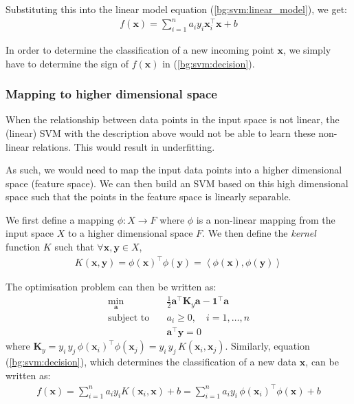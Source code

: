 \documentclass[12pt, twoside, a4paper]{article}
\def\vec{\boldsymbol}
\begin{document}
Substituting this into the linear model equation (\ref{bg:svm:linear_model}), we get:
\begin{align}
f(\vec{x}) = \sum_{i=1}^n a_i y_i \vec{x}_i^\top \vec{x} + b \label{bg:svm:decision}
\end{align}

In order to determine the classification of a new incoming point $\vec{x}$, we simply have to determine the sign of $f(\vec{x})$ in (\ref{bg:svm:decision}).

\subsubsection{Mapping to higher dimensional space}
When the relationship between data points in the input space is not linear, the (linear) SVM with the description above would not be able to learn these non-linear relations. This would result in underfitting.

As such, we would need to map the input data points into a higher dimensional space (feature space). We can then build an SVM based on this high dimensional space such that the points in the feature space is linearly separable.

We first define a mapping $\phi : X \rightarrow F$ where $\phi$ is a non-linear mapping from the input space $X$ to a higher dimensional space $F$. We then define the \textit{kernel} function $K$ such that $\forall \vec x, \vec y \in X$,
\begin{align*}
K(\vec x, \vec y) = \phi(\vec x)^\top \phi(\vec{y}) = \left\langle \phi(\vec x) , \phi(\vec{y}) \right\rangle
\end{align*}

The optimisation problem can then be written as:
\begin{align*}
\min_{\vec a} \quad &\frac{1}{2} \vec{a}^\top \vec{K}_y \vec{a} - \vec{1}^\top \vec a \\
\text{subject to} \quad &a_i \geq 0, \quad i = 1, \dots , n \\
&\vec{a}^\top \vec y = 0
\end{align*}
where $\vec{K}_y = y_i \, y_j \, \phi(\vec{x}_i)^\top \phi(\vec{x}_j) = y_i \, y_j \, K(\vec{x}_i, \vec{x}_j)$. Similarly, equation (\ref{bg:svm:decision}), which determines the classification of a new data $\vec{x}$, can be written as:
\begin{align*}
f(\vec{x}) = \sum_{i=1}^n a_i y_i K(\vec{x}_i, \vec{x}) + b = \sum_{i=1}^n a_i y_i \, \phi(\vec{x}_i)^\top \phi(\vec{x}) + b
\end{align*}
\end{document}
